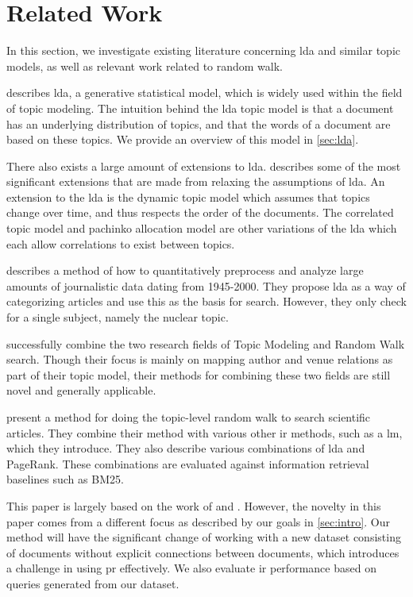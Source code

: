 \section{Related Work}\label{sec:related-works}
In this section, we investigate existing literature concerning \gls{lda} and similar topic models, as well as relevant work related to random walk.

\citet{lda} describes \acrlong{lda}, a generative statistical model, which is widely used within the field of topic modeling. 
The intuition behind the \gls{lda} topic model is that a document has an underlying distribution of topics, and that the words of a document are based on these topics.
We provide an overview of this model in \autoref{sec:lda}.

There also exists a large amount of extensions to \gls{lda}.
\citet{blei2012topicmodels} describes some of the most significant extensions that are made from relaxing the assumptions of \gls{lda}.
An extension to the \gls{lda} is the dynamic topic model\cite{blei2006dynamic} which assumes that topics change over time, and thus respects the order of the documents. 
The correlated topic model\cite{blei2007correlated} and pachinko allocation model\cite{li2006pachinko} are other variations of the \gls{lda} which each allow correlations to exist between topics.


\citet{quanti} describes a method of how to quantitatively preprocess and analyze large amounts of journalistic data dating from 1945-2000. 
They propose \gls{lda} as a way of categorizing articles and use this as the basis for search.
However, they only check for a single subject, namely the nuclear topic.  


\citet{Tang2008} successfully combine the two research fields of Topic Modeling and Random Walk search. 
Though their focus is mainly on mapping author and venue relations as part of their topic model, their methods for combining these two fields are still novel and generally applicable.


\citet{yang2009topic} present a method for doing the topic-level random walk to search scientific articles.
They combine their method with various other \gls{ir} methods, such as a \gls{lm}, which they introduce.
They also describe various combinations of \gls{lda} and PageRank.
These combinations are evaluated against information retrieval baselines such as BM25\cite{bm251996}.


This paper is largely based on the work of \citet{yang2009topic} and \citet{Tang2008}.
However, the novelty in this paper comes from a different focus as described by our goals in \autoref{sec:intro}.
Our method will have the significant change of working with a new dataset consisting of documents without explicit connections between documents, which introduces a challenge in using \gls{pr} effectively.
We also evaluate \gls{ir} performance based on queries generated from our dataset.

